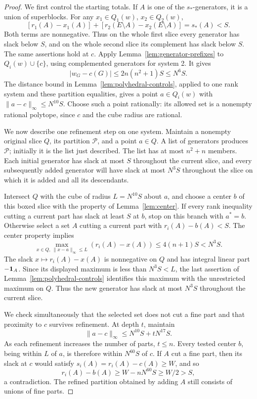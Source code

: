 \begin{proof}
We first control the starting totals.  If \(A\) is one of the
\(s_*\)-generators, it is a union of superblocks.  For any
\(x_1\in Q_1(w)\), \(x_2\in Q_2(w)\),
\[
 [r_1(A)-x_1(A)]+[r_2(E\setminus A)-x_2(E\setminus A)]
 =s_*(A)<S.
\]
Both terms are nonnegative.  Thus on the whole first slice every
generator has slack below \(S\), and on the whole second slice
its complement has slack below \(S\).  The same assertions hold
at \(c\).  Apply Lemma~\ref{lem:generator-prefixes} to
\(Q_i(w)\cup\{c\}\), using complemented generators for system 2.
It gives
\begin{equation}\label{eq:initial-total-distance}
 |w_G-c(G)|\le 2n(n^2+1)S\le N^6S.
\end{equation}
The distance bound in Lemma~\ref{lem:polyhedral-controls}, applied
to one rank system and these partition equalities, gives a point
\(a\in Q_i(w)\) with \(\|a-c\|_\infty\le N^{10}S\).
Choose such a point rationally: its allowed set is a nonempty
rational polytope, since \(c\) and the cube radius are rational.

We now describe one refinement step on one system.  Maintain a
nonempty original slice \(Q\), its partition \(\mathcal P\),
and a point \(a\in Q\).  A list of generators produces
\(\mathcal P\); initially it is the list just described.  The
list has at most \(n^2+n\) members.  Each initial generator has
slack at most \(S\) throughout the current slice, and every
subsequently added generator will have slack at most \(N^3S\)
throughout the slice on which it is added and all its descendants.

Intersect \(Q\) with the cube of radius \(L=N^{10}S\) about
\(a\), and choose a center \(b\) of this boxed slice with the
property of Lemma~\ref{lem:center}.  If every rank inequality
cutting a current part has slack at least \(S\) at \(b\), stop
on this branch with \(a^*=b\).  Otherwise select a set \(A\)
cutting a current part with \(r_i(A)-b(A)<S\).  The center
property implies
\[
 \max_{x\in Q,\ \|x-a\|_\infty\le L}
             (r_i(A)-x(A))
 \le 4(n+1)S<N^3S.
\]
The slack \(x\mapsto r_i(A)-x(A)\) is nonnegative on \(Q\)
and has integral linear part \(-\mathbf 1_A\).  Since its displayed
maximum is less than \(N^3S<L\), the last assertion of
Lemma~\ref{lem:polyhedral-controls} identifies this maximum with
the unrestricted maximum on \(Q\).  Thus the new generator has
slack at most \(N^3S\) throughout the current slice.

We check simultaneously that the selected set does not cut a fine
part and that proximity to \(c\) survives refinement.  At depth
\(t\), maintain
\begin{equation}\label{eq:refinement-distance-induction}
 \|a-c\|_\infty\le N^{10}S+tN^{17}S.
\end{equation}
As each refinement increases the number of parts, \(t\le n\).
Every tested center \(b\), being within \(L\) of \(a\), is
therefore within \(N^{60}S\) of \(c\).  If \(A\) cut a fine
part, then its slack at \(c\) would satisfy
\(s_i(A)=r_i(A)-c(A)\ge W\), and so
\[
 r_i(A)-b(A)\ge W-nN^{60}S\ge W/2>S,
\]
a contradiction.  The refined partition obtained by adding
\(A\) still consists of unions of fine parts.


\end{proof}
